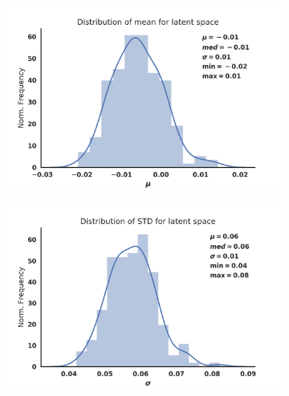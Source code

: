 \begin{figure}[h]
\centering
  \begin{subfigure}{0.45\textwidth}
    \caption{}
    \includegraphics[width=\textwidth]{./mean_Z.png}
  \end{subfigure}
  \begin{subfigure}{0.45\textwidth}
    \caption{}
    \includegraphics[width=\textwidth]{./STD_Z.png}
  \end{subfigure}
  \vspace{1em}
  \begin{subfigure}{0.45\textwidth}
    \caption{}

\end{subfigure}
\end{figure}
